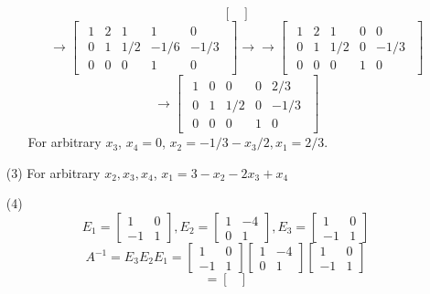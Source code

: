 \documentclass[openany]{book}
\begin{document}
\begin{itemize}
\begin{itemize}
$$\begin{bmatrix}
\end{bmatrix}$$
$$\rightarrow \begin{bmatrix}
\begin{array}{cccc|c}
1 & 2 & 1 & 1 & 0 \\
0 & 1 & 1/2 & -1/6 & -1/3 \\
0 & 0 & 0 & 1 & 0
\end{array}
\end{bmatrix}\rightarrow\rightarrow \begin{bmatrix}
\begin{array}{cccc|c}
1 & 2 & 1 & 0 & 0 \\
0 & 1 & 1/2 & 0 & -1/3 \\
0 & 0 & 0 & 1 & 0
\end{array}
\end{bmatrix}$$
$$\rightarrow \begin{bmatrix}
\begin{array}{cccc|c}
1 & 0 & 0 & 0 & 2/3 \\
0 & 1 & 1/2 & 0 & -1/3 \\
0 & 0 & 0 & 1 & 0
\end{array}
\end{bmatrix}$$
For arbitrary $x_3$, $x_4 = 0$, $x_2 = -1/3 - x_3/2, x_1 = 2/3$.
\end{itemize}
\item[(3)]
For arbitrary $x_2, x_3, x_4$, $x_1 = 3 - x_2 - 2x_3 + x_4$
\item[(4)]
$$E_1 = \begin{bmatrix}
1 & 0 \\
-1 & 1
\end{bmatrix}, E_2 = \begin{bmatrix}
1 & -4 \\
0 & 1
\end{bmatrix}, E_3 = \begin{bmatrix}
1 & 0 \\
-1 & 1
\end{bmatrix}$$
$$A^{-1} = E_3E_2E_1 = \begin{bmatrix}
1 & 0 \\
-1 & 1
\end{bmatrix}\begin{bmatrix}
1 & -4 \\
0 & 1
\end{bmatrix}\begin{bmatrix}
1 & 0 \\
-1 & 1
\end{bmatrix}$$
$$= \begin{bmatrix}

\end{bmatrix}$$
\end{itemize}
\end{document}
